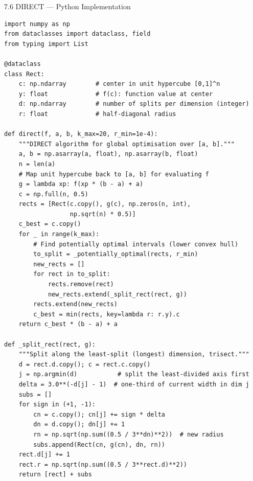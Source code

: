 \documentclass[aspectratio=169,10pt]{beamer}
\begin{document}
\begin{frame}[fragile]{7.6 DIRECT --- Python Implementation}
\begin{lstlisting}[style=python, caption={DIRECT algorithm in Python}]
import numpy as np
from dataclasses import dataclass, field
from typing import List

@dataclass
class Rect:
    c: np.ndarray        # center in unit hypercube [0,1]^n
    y: float             # f(c): function value at center
    d: np.ndarray        # number of splits per dimension (integer)
    r: float             # half-diagonal radius

def direct(f, a, b, k_max=20, r_min=1e-4):
    """DIRECT algorithm for global optimisation over [a, b]."""
    a, b = np.asarray(a, float), np.asarray(b, float)
    n = len(a)
    # Map unit hypercube back to [a, b] for evaluating f
    g = lambda xp: f(xp * (b - a) + a)
    c = np.full(n, 0.5)
    rects = [Rect(c.copy(), g(c), np.zeros(n, int),
                  np.sqrt(n) * 0.5)]
    c_best = c.copy()
    for _ in range(k_max):
        # Find potentially optimal intervals (lower convex hull)
        to_split = _potentially_optimal(rects, r_min)
        new_rects = []
        for rect in to_split:
            rects.remove(rect)
            new_rects.extend(_split_rect(rect, g))
        rects.extend(new_rects)
        c_best = min(rects, key=lambda r: r.y).c
    return c_best * (b - a) + a

def _split_rect(rect, g):
    """Split along the least-split (longest) dimension, trisect."""
    d = rect.d.copy(); c = rect.c.copy()
    j = np.argmin(d)           # split the least-divided axis first
    delta = 3.0**(-d[j] - 1)  # one-third of current width in dim j
    subs = []
    for sign in (+1, -1):
        cn = c.copy(); cn[j] += sign * delta
        dn = d.copy(); dn[j] += 1
        rn = np.sqrt(np.sum((0.5 / 3**dn)**2))  # new radius
        subs.append(Rect(cn, g(cn), dn, rn))
    rect.d[j] += 1
    rect.r = np.sqrt(np.sum((0.5 / 3**rect.d)**2))
    return [rect] + subs
\end{lstlisting}
\end{frame}
\end{document}

